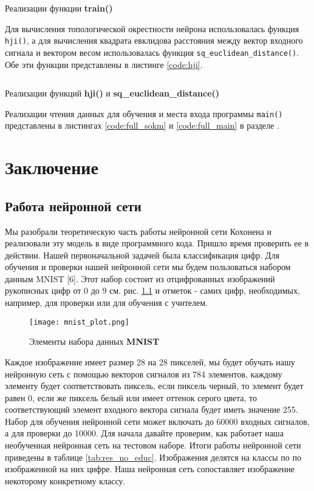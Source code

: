 \documentclass[a4paper,12pt]{report}
\begin{document}
\begin{code}
    \inputminted{cpp}{code/train.hpp}
    \caption{Реализации функции \textbf{train()}}
    \label{code:train}
\end{code}
\vspace{5mm}

Для вычисления топологической окрестности нейрона использовалась
функция \verb|hji()|, а для вычисления квадрата евклидова расстояния
между вектор входного сигнала и вектором весом использовалась функция
\verb|sq_euclidean_distance()|. Обе эти функции представлены в листинге
\ref{code:hji}.

\begin{code}
    \captionsetup{justification=centering, skip=3pt}
    \inputminted{cpp}{code/train.hpp}
    \caption{Реализации функций \textbf{hji()} и \textbf{sq\_euclidean\_distance()}}
    \label{code:hji}
\end{code}
\vspace{5mm}

Реализации чтения данных для обучения и места входа программы \verb|main()|
представлены в листингах \ref{code:full_sokm}
и \ref{code:full_main} в разделе .

\chapter{Заключение}
\section{Работа нейронной сети}
Мы разобрали теоретическую часть работы нейронной сети Кохонена и
реализовали эту модель в виде программного кода. Пришло время
проверить ее в действии. Нашей первоначальной задачей была
классификация цифр. Для обучения и проверки нашей нейронной сети мы
будем пользоваться набором данным MNIST [6]. Этот набор состоит из
отцифрованных изображений
рукописных цифр от 0 до 9 см. рис. \ref{fig:mnist_ex} и отметок -
самих цифр, необходимых, например, для проверки или для обучения с
учителем.

\begin{figure}[!htb]
    \centering
    \captionsetup{justification=centering}
    \texttt{[image: mnist\_plot.png]}
    \caption{Элементы набора данных \textbf{MNIST}}
    \label{fig:mnist_ex}
\end{figure}

Каждое изображение имеет размер 28 на 28 пикселей, мы будет
обучать нашу нейронную сеть с помощью векторов сигналов из 784
элементов, каждому элементу будет соответствовать пиксель, если
пиксель черный, то элемент будет равен 0, если же пиксель белый или
имеет оттенок серого цвета, то соответствующий элемент входного
вектора сигнала будет иметь значение 255. Набор для обучения нейронной
сети может включать до 60000 входных сигналов, а для проверки до
10000. Для начала давайте проверим, как работает наша необученная
нейронная сеть на тестовом наборе. Итоги работы нейронной сети
приведены в таблице \ref{tab:res_no_educ}. Изображения делятся на классы по по
изображенной на них цифре. Наша нейронная сеть сопоставляет
изображение некоторому конкретному классу.
\end{document}
